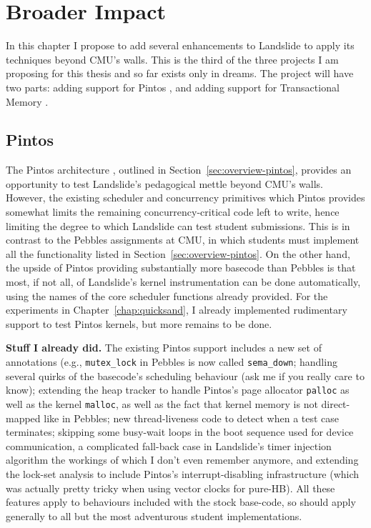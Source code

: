 \chapter{Broader Impact}
\label{chap:lipservice}

In this chapter I propose to add several enhancements to Landslide to apply its techniques beyond CMU's walls.
This is the third of the three projects I am proposing for this thesis and so far exists only in dreams.
The project will have two parts: adding support for Pintos \cite{pintos}, and adding support for Transactional Memory \cite{transactional-memory}.

\section{Pintos}
\label{sec:pintos-todo}

The Pintos architecture \cite{pintos}, outlined in Section~\ref{sec:overview-pintos}, provides an opportunity to test Landslide's pedagogical mettle beyond CMU's walls.
However, the existing scheduler and concurrency primitives which Pintos provides somewhat limits the remaining concurrency-critical code left to write,
hence limiting the degree to which Landslide can test student submissions.
This is in contrast to the Pebbles assignments at CMU, in which students must implement all the functionality listed in Section~\ref{sec:overview-pintos}.
On the other hand, the upside of Pintos providing substantially more basecode than Pebbles is that most, if not all, of Landslide's kernel instrumentation can be done automatically,
using the names of the core scheduler functions already provided.
For the experiments in Chapter~\ref{chap:quicksand}, I already implemented rudimentary support to test Pintos kernels, but more remains to be done.

{\bf Stuff I already did.}
The existing Pintos support includes
a new set of annotations (e.g., {\tt mutex\_lock} in Pebbles is now called {\tt sema\_down};
handling several quirks of the basecode's scheduling behaviour (ask me if you really care to know);
extending the heap tracker to handle Pintos's page allocator {\tt palloc} as well as the kernel {\tt malloc},
as well as the fact that kernel memory is not direct-mapped like in Pebbles;
new thread-liveness code to detect when a test case terminates;
skipping some busy-wait loops in the boot sequence used for device communication,
a complicated fall-back case in Landslide's timer injection algorithm the workings of which I don't even remember anymore,
and extending the lock-set analysis to include Pintos's interrupt-disabling infrastructure (which was actually pretty tricky when using vector clocks for pure-HB).
All these features apply to behaviours included with the stock base-code, so should apply generally to all but the most adventurous student implementations.

